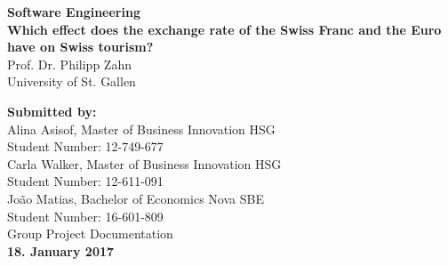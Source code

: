 \documentclass[12pt,a4paper,bibliography=totocnumbered,listof=totocnumbered]{scrartcl}
\begin{document}

\renewcommand{\sectionmark}[1]{\markright{#1}}
\renewcommand{\leftmark}{\rightmark}
\pagestyle{fancy}
\lhead{ }
\chead{ }
\rhead{\thesection\space\contentsname}
\cfoot{ }
\renewcommand{\headrulewidth}{0.4pt}
\renewcommand{\footrulewidth}{0.4pt}

\renewcommand{\thesection}{\Roman{section}}
\renewcommand{\theHsection}{\Roman{section}}

\thispagestyle{empty}
\begin{center}
	
	\vspace*{2cm}
	\Huge
	\textbf{Software Engineering}\\
\vfill
	\Large
	\textbf{Which effect does the exchange rate of the Swiss Franc and the Euro have on Swiss tourism?}\\
\vfill
	\Large
	{Prof. Dr. Philipp Zahn}\\
	\Large
	University of St. Gallen
	
\vfill


\end{center}

\begin{flushleft}	
	\vfill
	\normalsize
\textbf{Submitted by:} \\
Alina Asisof, Master of Business Innovation HSG\\
Student Number: 12-749-677\\ 
Carla Walker, Master of Business Innovation HSG\\ 
Student Number: 12-611-091\\ 

Jo\~ao Matias, Bachelor of Economics Nova SBE\\ 
Student Number: 16-601-809\\ 
\vfill
Group Project Documentation\\ 
 
\vfill
\textbf{18. January 2017}

\end{flushleft}	
\end{document}
